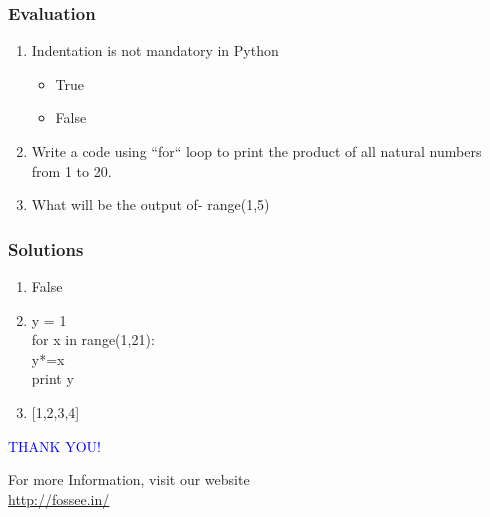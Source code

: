 \documentclass[presentation]{beamer}
\begin{document}
\begin{frame}
\frametitle{Evaluation}
\label{sec-13}


\begin{enumerate}
\item Indentation is not mandatory in Python
\begin{itemize}
\item True
\item False
\end{itemize}
\vspace{8pt}
\item Write a code using ``for`` loop to print the product of all natural numbers from 1 to 20.
\vspace{8pt}
\item What will be the output of-
     range(1,5)
\end{enumerate}
\end{frame}
\begin{frame}
\frametitle{Solutions}
\label{sec-14}


\begin{enumerate}
\item False
\vspace{8pt}
\item y = 1\\
for x in range(1,21):\\
\hspace{12pt}
          y*=x\\
    print y 
\vspace{8pt}      
\item {[1,2,3,4]}
\end{enumerate}
\end{frame}
\begin{frame}

  \begin{block}{}
  \begin{center}
  \textcolor{blue}{\Large THANK YOU!} 
  \end{center}
  \end{block}
\begin{block}{}
  \begin{center}
    For more Information, visit our website\\
    \url{http://fossee.in/}
  \end{center}  
  \end{block}
\end{frame}
\end{document}

